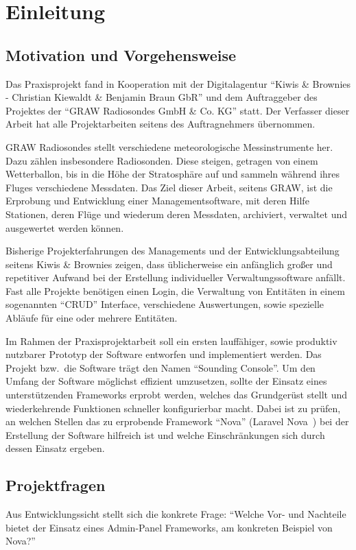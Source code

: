\section{Einleitung}

\subsection{Motivation und Vorgehensweise}
Das Praxisprojekt fand in Kooperation mit der Digitalagentur \enquote{Kiwis \& Brownies - Christian Kiewaldt \& Benjamin Braun GbR}\cite{kiwis} und dem Auftraggeber des Projektes der \enquote{GRAW Radiosondes GmbH \& Co. KG}\cite{graw} statt.
Der Verfasser dieser Arbeit hat alle Projektarbeiten seitens des Auftragnehmers übernommen.

GRAW Radiosondes stellt verschiedene meteorologische Messinstrumente her.
Dazu zählen insbesondere Radiosonden.
Diese steigen, getragen von einem Wetterballon, bis in die Höhe der Stratosphäre auf und sammeln während ihres Fluges verschiedene Messdaten.
Das Ziel dieser Arbeit, seitens GRAW, ist die Erprobung und Entwicklung einer Managementsoftware, mit deren Hilfe Stationen, deren Flüge und wiederum deren Messdaten, archiviert, verwaltet und ausgewertet werden können.

Bisherige Projekterfahrungen des Managements und der Entwicklungsabteilung seitens Kiwis \& Brownies zeigen, dass üblicherweise ein anfänglich großer und repetitiver Aufwand bei der Erstellung individueller Verwaltungssoftware anfällt.
Fast alle Projekte benötigen einen Login, die Verwaltung von Entitäten in einem sogenannten \enquote{CRUD}\cite{crud} Interface, verschiedene Auswertungen, sowie spezielle Abläufe für eine oder mehrere Entitäten.

Im Rahmen der Praxisprojektarbeit soll ein ersten lauffähiger, sowie produktiv nutzbarer Prototyp der Software entworfen und implementiert werden.
Das Projekt bzw.\ die Software trägt den Namen \enquote{Sounding Console}.
Um den Umfang der Software möglichst effizient umzusetzen, sollte der Einsatz eines unterstützenden Frameworks erprobt werden, welches das Grundgerüst stellt und wiederkehrende Funktionen schneller konfigurierbar macht.
Dabei ist zu prüfen, an welchen Stellen das zu erprobende Framework \enquote{Nova} (Laravel Nova~\cite{laravel-nova}) bei der Erstellung der Software hilfreich ist und welche Einschränkungen sich durch dessen Einsatz ergeben.

\newpage

\subsection{Projektfragen}
Aus Entwicklungssicht stellt sich die konkrete Frage:
\enquote{Welche Vor- und Nachteile bietet der Einsatz eines Admin-Panel Frameworks, am konkreten Beispiel von Nova?}

